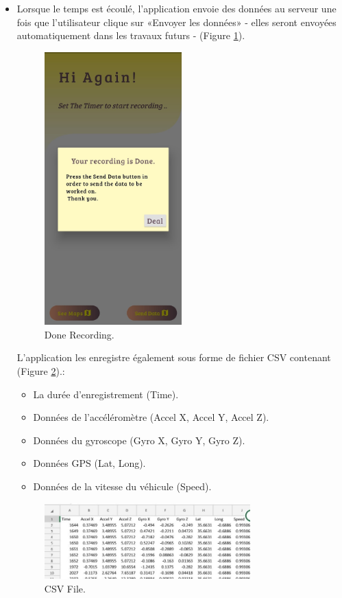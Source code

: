 \begin{itemize}
    \item Lorsque le temps est écoulé, l'application envoie des données au serveur une fois que l'utilisateur clique sur «Envoyer les données» - elles seront envoyées automatiquement dans les travaux futurs - (Figure \ref{fig:Done}).
          \begin{figure}[h!]
              \center
              \includegraphics[width=0.50\textwidth]{Images/recordingApp/doneRecording.jpg}
              \caption{Done Recording.}
              \label{fig:Done}
          \end{figure}

          L'application les enregistre également sous forme de fichier CSV contenant  (Figure \ref{fig:csv}).:
          \begin{itemize}
              \item La durée d'enregistrement (Time).
              \item Données de l'accéléromètre (Accel X, Accel Y, Accel Z).
              \item Données du gyroscope (Gyro X, Gyro Y, Gyro Z).
              \item Données GPS (Lat, Long).
              \item Données de la vitesse du véhicule (Speed).
          \end{itemize}
          \begin{figure}[h!]
              \center
              \includegraphics[width=0.75\textwidth]{Images/recordingApp/csv.jpg}
              \caption{CSV File.}
              \label{fig:csv}
          \end{figure}




\end{itemize}
